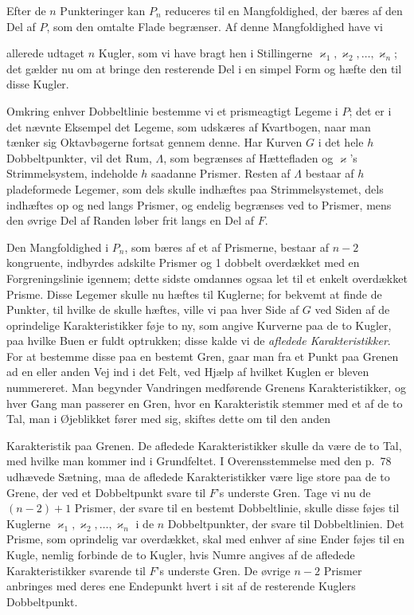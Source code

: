 \documentclass{article}
\begin{document}
Efter de $n$ Punkteringer kan $P_n$ reduceres til en Mangfoldighed, der bæres af den Del af $P$, som den omtalte Flade begrænser. Af denne Mangfoldighed have vi

allerede udtaget $n$ Kugler, som vi have bragt hen i Stillingerne $\varkappa_1, \varkappa_2, \dots, \varkappa_n$; det gælder nu om at bringe den resterende Del i en simpel Form og hæfte den til disse Kugler.

Omkring enhver Dobbeltlinie bestemme vi et prismeagtigt Legeme i $P$; det er i det nævnte Eksempel det Legeme, som udskæres af Kvartbogen, naar man tænker sig Oktavbøgerne fortsat gennem denne. Har Kurven $G$ i det hele $h$ Dobbeltpunkter, vil det Rum, $\Lambda$, som begrænses af Hættefladen og $\varkappa$'s Strimmelsystem, indeholde $h$ saadanne Prismer. Resten af $\Lambda$ bestaar af $h$ pladeformede Legemer, som dels skulle indhæftes paa Strimmelsystemet, dels indhæftes op og ned langs Prismer, og endelig begrænses ved to Prismer, mens den øvrige Del af Randen løber frit langs en Del af $F$.

Den Mangfoldighed i $P_n$, som bæres af et af Prismerne, bestaar af $n - 2$ kongruente, indbyrdes adskilte Prismer og 1 dobbelt overdækket med en Forgreningslinie igennem; dette sidste omdannes ogsaa let til et enkelt overdækket Prisme. Disse Legemer skulle nu hæftes til Kuglerne; for bekvemt at finde de Punkter, til hvilke de skulle hæftes, ville vi paa hver Side af $G$ ved Siden af de oprindelige Karakteristikker føje to ny, som angive Kurverne paa de to Kugler, paa hvilke Buen er fuldt optrukken; disse kalde vi de \emph{afledede Karakteristikker}. For at bestemme disse paa en bestemt Gren, gaar man fra et Punkt paa Grenen ad en eller anden Vej ind i det Felt, ved Hjælp af hvilket Kuglen er bleven nummereret. Man begynder Vandringen medførende Grenens Karakteristikker, og hver Gang man passerer en Gren, hvor en Karakteristik stemmer med et af de to Tal, man i Øjeblikket fører med sig, skiftes dette om til den anden

Karakteristik paa Grenen. De afledede Karakteristikker skulle da være de to Tal, med hvilke man kommer ind i Grundfeltet. I Overensstemmelse med den p.\ 78 udhævede Sætning, maa de afledede Karakteristikker være lige store paa de to Grene, der ved et Dobbeltpunkt svare til $F$'s underste Gren. Tage vi nu de $(n - 2) + 1$ Prismer, der svare til en bestemt Dobbeltlinie, skulle disse føjes til Kuglerne $\varkappa_1, \varkappa_2, \dots, \varkappa_n$ i de $n$ Dobbeltpunkter, der svare til Dobbeltlinien. Det Prisme, som oprindelig var overdækket, skal med enhver af sine Ender føjes til en Kugle, nemlig forbinde de to Kugler, hvis Numre angives af de afledede Karakteristikker svarende til $F$'s underste Gren. De øvrige $n - 2$ Prismer anbringes med deres ene Endepunkt hvert i sit af de resterende Kuglers Dobbeltpunkt.
\end{document}
